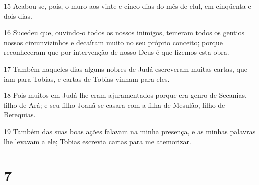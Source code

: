 \par 15 Acabou-se, pois, o muro aos vinte e cinco dias do mês de elul, em cinqüenta e dois dias.
\par 16 Sucedeu que, ouvindo-o todos os nossos inimigos, temeram todos os gentios nossos circunvizinhos e decaíram muito no seu próprio conceito; porque reconheceram que por intervenção de nosso Deus é que fizemos esta obra.
\par 17 Também naqueles dias alguns nobres de Judá escreveram muitas cartas, que iam para Tobias, e cartas de Tobias vinham para eles.
\par 18 Pois muitos em Judá lhe eram ajuramentados porque era genro de Secanias, filho de Ará; e seu filho Joanã se casara com a filha de Mesulão, filho de Berequias.
\par 19 Também das suas boas ações falavam na minha presença, e as minhas palavras lhe levavam a ele; Tobias escrevia cartas para me atemorizar.

\chapter{7}

